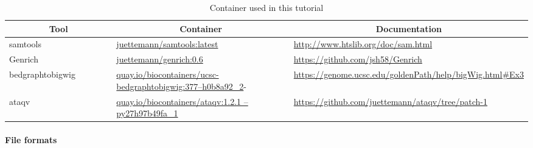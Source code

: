 \documentclass[12pt]{article}
\begin{document}
			\begin{table}[H]
				\begin{center}
					\begin{adjustbox}{width=1\textwidth}
						\begin{tabular}{p{0.25\linewidth} | p{0.4\linewidth} | p{0.45\linewidth}}
							
							\multicolumn{1}{c}{ \textbf{Tool}} & \multicolumn{1}{c}{\textbf{Container}} & \multicolumn{1}{c}{\textbf{Documentation}} \\
							\hline
							samtools & \href{https://hub.docker.com/repository/docker/juettemann/samtools}{juettemann/samtools:latest} & \url{http://www.htslib.org/doc/sam.html} \\
							\hline
							Genrich & \href{https://hub.docker.com/repository/docker/juettemann/genrich}{juettemann/genrich:0.6} & \url{https://github.com/jsh58/Genrich}\\
							\hline
							bedgraphtobigwig & \href{https://quay.io/repository/biocontainers/ucsc-bedgraphtobigwig}{quay.io/biocontainers/ucsc-bedgraphtobigwig:377–h0b8a92\_2}- & \url{https://genome.ucsc.edu/goldenPath/help/bigWig.html#Ex3}\\
							\hline
							ataqv & \href{https://quay.io/repository/biocontainers/ataqv?tag=1.2.1-py27h97b49fa_1}{quay.io/biocontainers/ataqv:1.2.1
								–py27h97b49fa\_1} & \url{https://github.com/juettemann/ataqv/tree/patch-1} \\
							\hline
						\end{tabular}
					\end{adjustbox}
					\caption[Container]{Container used in this tutorial }
					\label{table:genrich}
				\end{center}
			\end{table}

	\paragraph{File formats}
			
\end{document}
